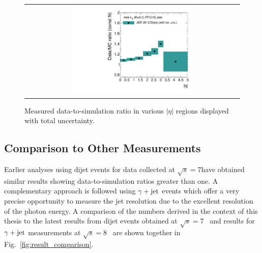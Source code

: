 \begin{figure}[!h]
  \centering
  \begin{tabular}{c}
                \includegraphics[width=0.6\textwidth]{figures/JER_2012_final_combination_v1.pdf}
  \end{tabular}
  \caption{Measured data-to-simulation ratio in various $|\eta|$ regions displayed with total uncertainty.}
  \label{fig:result_2012}
\end{figure}
 
\subsection{Comparison to Other Measurements}
\label{subsec:jer_results_comparison}
Earlier analyses using dijet events for data collected at $\sqrt{s}=7$\tev have obtained similar results showing data-to-simulation ratios greater than one. A complementary approach is followed using $\gamma +\rm{jet}$ events which offer a very precise opportunity to measure the jet resolution due to the excellent resolution of the photon energy. A comparison of the numbers derived in the context of this thesis to the latest results from dijet events obtained at $\sqrt{s}=7$\tev~\cite{thesis:Schroeder} and results for $\gamma +\rm{jet}$ measurements at $\sqrt{s}=8$\tev~\cite{CMS-AN-2013-179} are shown together in Fig.~\ref{fig:result_comparison}.

